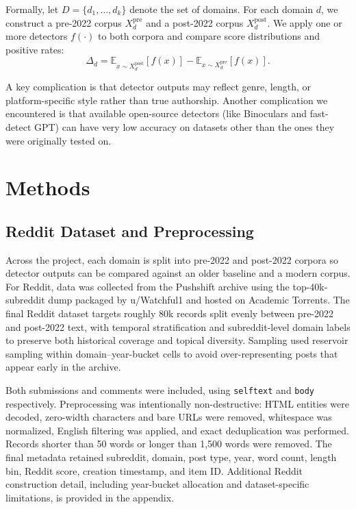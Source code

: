 \documentclass[11pt]{article}
\begin{document}
Formally, let $D = \{d_1, \dots, d_k\}$ denote the set of domains. For each
domain $d$, we construct a pre-2022 corpus $X^{\text{pre}}_d$ and a post-2022
corpus $X^{\text{post}}_d$. We apply one or more detectors $f(\cdot)$ to both
corpora and compare score distributions and positive rates:
\[
\Delta_d = \mathbb{E}_{x \sim X^{\text{post}}_d}[f(x)] -
\mathbb{E}_{x \sim X^{\text{pre}}_d}[f(x)].
\]

A key complication is that detector outputs may reflect genre, length, or
platform-specific style rather than true authorship. Another complication we encountered is that available open-source detectors (like Binoculars and fast-detect GPT) can have very low accuracy on datasets other than the ones they were originally tested on. 

\section{Methods}
\subsection{Reddit Dataset and Preprocessing}
Across the project, each domain is split into pre-2022 and post-2022 corpora
so detector outputs can be compared against an older baseline and a modern
corpus. For Reddit, data was collected from the Pushshift archive using the
top-40k-subreddit dump packaged by u/Watchful1 and hosted on Academic
Torrents. The final Reddit dataset targets roughly 80k records split evenly
between pre-2022 and post-2022 text, with temporal stratification and
subreddit-level domain labels to preserve both historical coverage and topical
diversity. Sampling used reservoir sampling within domain--year-bucket cells
to avoid over-representing posts that appear early in the archive.

Both submissions and comments were included, using \texttt{selftext} and
\texttt{body} respectively. Preprocessing was intentionally non-destructive:
HTML entities were decoded, zero-width characters and bare URLs were removed,
whitespace was normalized, English filtering was applied, and exact
deduplication was performed. Records shorter than 50 words or longer than
1,500 words were removed. The final metadata retained subreddit, domain, post
type, year, word count, length bin, Reddit score, creation timestamp, and
item ID. Additional Reddit construction detail, including year-bucket
allocation and dataset-specific limitations, is provided in the appendix.
\end{document}
